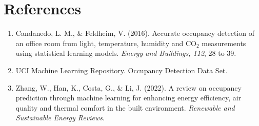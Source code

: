\documentclass[12pt]{article}
\begin{document}
\section{References}
\begin{enumerate}
    \item Candanedo, L. M., \& Feldheim, V. (2016). Accurate occupancy detection of an office room from light, temperature, humidity and CO$_2$ measurements using statistical learning models. \textit{Energy and Buildings, 112}, 28 to 39.
    \item UCI Machine Learning Repository. Occupancy Detection Data Set.
    \item Zhang, W., Han, K., Costa, G., \& Li, J. (2022). A review on occupancy prediction through machine learning for enhancing energy efficiency, air quality and thermal comfort in the built environment. \textit{Renewable and Sustainable Energy Reviews}.
\end{enumerate}
\end{document}

